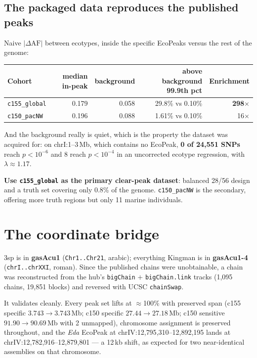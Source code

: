 \documentclass[11pt,a4paper]{article}
\newcommand{\gene}[1]{\textit{#1}}
\begin{document}
\subsection{The packaged data reproduces the published peaks}

Naive $|\Delta\text{AF}|$ between ecotypes, inside the specific EcoPeaks versus the rest of
the genome:

\begin{table}[h]\centering\small
\begin{tabular}{lrrrr}\toprule
Cohort & median in-peak & background & above background 99.9th pct & Enrichment \\ \midrule
\texttt{c155\_global} & 0.179 & 0.058 & 29.8\% vs 0.10\% & \textbf{298$\times$} \\
\texttt{c150\_pacNW}  & 0.196 & 0.088 & 1.61\% vs 0.10\% & 16$\times$ \\ \bottomrule
\end{tabular}
\end{table}

And the background really is quiet, which is the property the dataset was acquired for: on
chrI:1--3\,Mb, which contains no EcoPeak, \textbf{0 of 24{,}551 SNPs} reach $p<10^{-6}$ and
8 reach $p<10^{-4}$ in an uncorrected ecotype regression, with $\lambda \approx 1.17$.

\textbf{Use \texttt{c155\_global} as the primary clear-peak dataset}: balanced 28/56 design
and a truth set covering only 0.8\% of the genome. \texttt{c150\_pacNW} is the secondary,
offering more truth regions but only 11 marine individuals.

\section{The coordinate bridge}\label{sec:lift}

3sp is in \textbf{gasAcu1} (\texttt{Chr1..Chr21}, arabic); everything Kingman is in
\textbf{gasAcu1-4} (\texttt{chrI..chrXXI}, roman). Since the published chains were
unobtainable, a chain was reconstructed from the hub's \texttt{bigChain} $+$
\texttt{bigChain.link} tracks (1{,}095 chains, 19{,}851 blocks) and reversed with UCSC
\texttt{chainSwap}.

It validates cleanly. Every peak set lifts at $\approx$100\% with preserved span
(c155 specific $3.743 \rightarrow 3.743$\,Mb; c150 specific $27.44 \rightarrow 27.18$\,Mb;
c150 sensitive $91.90 \rightarrow 90.69$\,Mb with 2 unmapped), chromosome assignment is
preserved throughout, and the \gene{Eda} EcoPeak at chrIV:12{,}795{,}310--12{,}892{,}195
lands at chrIV:12{,}782{,}916--12{,}879{,}801 --- a 12\,kb shift, as expected for two
near-identical assemblies on that chromosome.
\end{document}
